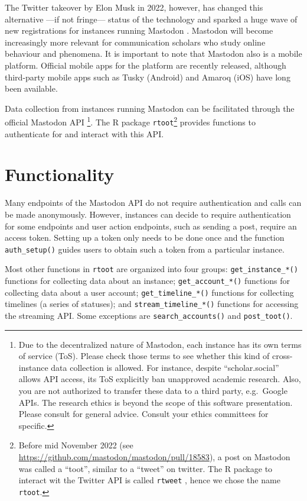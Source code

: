 \documentclass[Royal,times,sageh]{sagej}
\begin{document}
The Twitter takeover by Elon Musk in 2022, however, has changed this
alternative ---if not fringe--- status of the technology and sparked a
huge wave of new registrations for instances running Mastodon
\citep{huang_2022}. Mastodon will become increasingly more relevant for
communication scholars who study online behaviour and phenomena. It is
important to note that Mastodon also is a mobile platform. Official
mobile apps for the platform are recently released, although third-party
mobile apps such as Tusky (Android) and Amaroq (iOS) have long been
available.

Data collection from instances running Mastodon can be facilitated
through the official Mastodon API \citep{mastodonapi} \footnote{Due to
  the decentralized nature of Mastodon, each instance has its own terms
  of service (ToS). Please check those terms to see whether this kind of
  cross-instance data collection is allowed. For instance, despite
  ``scholar.social'' allows API access, its ToS explicitly ban
  unapproved academic research. Also, you are not authorized to transfer
  these data to a third party, e.g.~Google APIs. The research ethics is
  beyond the scope of this software presentation. Please consult
  \citet{zimmer2017internet} for general advice. Consult your ethics
  committees for specific.}. The R package \texttt{rtoot}\footnote{Before
  mid November 2022 (see
  \url{https://github.com/mastodon/mastodon/pull/18583}), a post on
  Mastodon was called a ``toot'', similar to a ``tweet'' on twitter. The
  R package to interact wit the Twitter API is called \texttt{rtweet}
  \citep{rtweet-package}, hence we chose the name \texttt{rtoot}.}
provides functions to authenticate for and interact with this API.

\hypertarget{functionality}{%
\section{Functionality}\label{functionality}}

Many endpoints of the Mastodon API do not require authentication and
calls can be made anonymously. However, instances can decide to require
authentication for some endpoints and user action endpoints, such as
sending a post, require an access token. Setting up a token only needs
to be done once and the function \texttt{auth\_setup()} guides users to
obtain such a token from a particular instance.

Most other functions in \texttt{rtoot} are organized into four groups:
\texttt{get\_instance\_*()} functions for collecting data about an
instance; \texttt{get\_account\_*()} functions for collecting data about
a user account; \texttt{get\_timeline\_*()} functions for collecting
timelines (a series of statuses); and \texttt{stream\_timeline\_*()}
functions for accessing the streaming API. Some exceptions are
\texttt{search\_accounts()} and \texttt{post\_toot()}.
\end{document}
